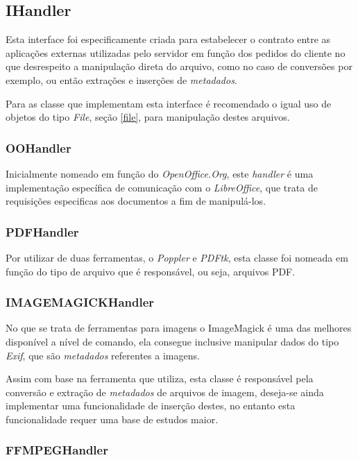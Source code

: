 {\subsection{IHandler}
\label{ihandler}

Esta interface foi especificamente criada para estabelecer o contrato entre as aplicações externas utilizadas pelo servidor em função dos pedidos do cliente no que desrespeito a manipulação direta do arquivo, como no caso de conversões por exemplo, ou então extrações e inserções de \textit{metadados}.

Para as classe que implementam esta interface é recomendado o igual uso de objetos do tipo \textit{File}, seção \ref{file}, para manipulação destes arquivos.


\subsubsection{OOHandler}

Inicialmente nomeado em função do \textit{OpenOffice.Org}, este \textit{handler} é uma implementação específica de comunicação com o \textit{LibreOffice}, que trata de requisições especificas aos documentos a fim de manipulá-los.


\subsubsection{PDFHandler}

Por utilizar de duas ferramentas, o \textit{Poppler} e \textit{PDFtk}, esta classe foi nomeada em função do tipo de arquivo que é responsável, ou seja, arquivos PDF. 


\subsubsection{IMAGEMAGICKHandler}

No que se trata de ferramentas para imagens o ImageMagick é uma das melhores disponível a nível de comando, ela consegue inclusive manipular dados do tipo \textit{Exif}, que são \textit{metadados} referentes a imagens.

Assim com base na ferramenta que utiliza, esta classe é responsável pela conversão e extração de \textit{metadados} de arquivos de imagem, deseja-se ainda implementar uma funcionalidade de inserção destes, no entanto esta funcionalidade requer uma base de estudos maior.


\subsubsection{FFMPEGHandler}

}
